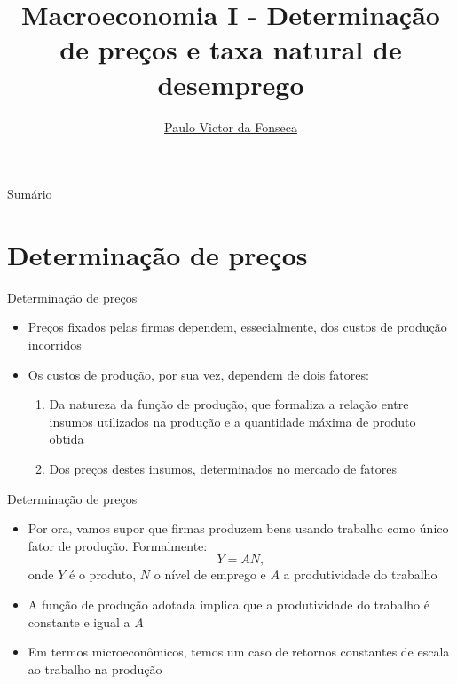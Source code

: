 \documentclass[10pt]{beamer}
\title[]{Macroeconomia I - Determinação de preços e taxa natural de desemprego}
\author[]{\href{https://pvfonseca.github.io}{Paulo Victor da Fonseca}}
\date{}
\begin{document}
\begin{frame}[plain]
\end{frame}

\begin{frame}{Sumário}
    \tableofcontents
\end{frame}

\section{Determinação de preços}
\begin{frame}
    {Determinação de preços}
    \begin{itemize}
        \item Preços fixados pelas firmas dependem, essecialmente, dos custos de produção incorridos\bigskip
        \item Os custos de produção, por sua vez, dependem de dois fatores:\medskip
        \begin{enumerate}
            \item Da natureza da função de produção, que formaliza a relação entre insumos utilizados na produção e a quantidade máxima de produto obtida\medskip
            \item Dos preços destes insumos, determinados no mercado de fatores
        \end{enumerate}
    \end{itemize}
\end{frame}

\begin{frame}
    {Determinação de preços}
    \begin{itemize}
        \item Por ora, vamos supor que firmas produzem bens usando trabalho como único fator de produção. Formalmente:
        \begin{equation}
            Y = AN,
        \end{equation}
        onde $Y$ é o produto, $N$ o nível de emprego e $A$ a produtividade do trabalho\bigskip
        \item A função de produção adotada implica que a produtividade do trabalho é constante e igual a $A$\bigskip
        \item Em termos microeconômicos, temos um caso de retornos constantes de escala ao trabalho na produção
    \end{itemize}
\end{frame}
\end{document}
